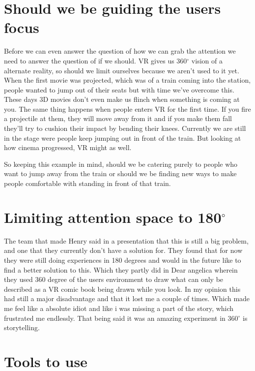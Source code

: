\documentclass{report}
\begin{document}
				\section{Should we be guiding the users focus}
				Before we can even answer the question of how we can grab the attention we need to answer the question of if we should. VR gives us 360$^{\circ}$ vision of a alternate reality, so should we limit ourselves because we aren't used to it yet. When the first movie was projected, which was of a train coming into the station, people wanted to jump out of their seats  but with time we've overcome this. These days 3D movies don't even make us flinch when something is coming at you. The same thing happens when people enters VR for the first time. If you fire a projectile at them, they will move away from it and if you make them fall they'll try to cushion their impact by bending their knees. Currently we are still in the stage were people keep jumping out in front of the train. But looking at how cinema progressed, VR might as well. 
				
				So keeping this example in mind, should we be catering purely to people who want to jump away from the train or should we be finding new ways to make people comfortable with standing in front of that train.
				
				\section{Limiting attention space to 180$^{\circ}$}
				The team that made Henry said in a presentation that this is  still a big problem, and one that they currently don't have a solution for. They found that for now they were still doing experiences in 180 degrees and would in the future like to find a better solution to this. Which they partly did in Dear angelica wherein they used 360 degree of the users environment to draw what can only be described as a VR comic book being drawn while you look. In my opinion this had still a major disadvantage and that it lost me a couple of times. Which made me feel like a absolute idiot and like i was missing a part of the story, which frustrated me endlessly. That being said it was an amazing experiment in 360$^{\circ}$ is storytelling.
				
				\section{Tools to use}
			
\end{document}
